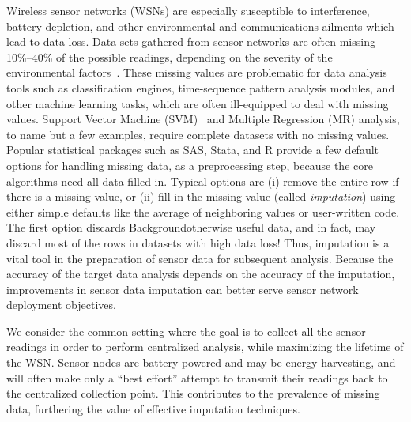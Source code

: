 

Wireless sensor networks (WSNs) are especially susceptible to interference,
battery depletion, and other environmental and communications ailments
which lead to data loss.  Data sets gathered from sensor networks are
often missing 10\%--40\% of the possible readings, depending on the
severity of the environmental factors~\cite{give cites}.  These
missing values are problematic for data analysis tools such as
classification engines, time-sequence pattern analysis modules, and
other machine learning tasks, which are often ill-equipped to deal
with missing values.  Support Vector Machine
(SVM)~\cite{vapnik2000nature} and Multiple Regression (MR) analysis,
to name but a few examples, require complete datasets with no missing
values.  Popular statistical packages such as SAS, Stata, and R
provide a few default options for handling missing data, as a
preprocessing step, because the core algorithms need all data filled
in.  Typical options are (i) remove the entire row if there is a
missing value, or (ii) fill in the missing value (called {\em
imputation}) using either simple defaults like the average of
neighboring values or user-written code.  The first option discards
Backgroundotherwise useful data, and in fact, may discard most of the rows in
datasets with high data loss!  Thus, imputation is a vital tool in the
preparation of sensor data for subsequent analysis. Because the
accuracy of the target data analysis depends on the accuracy of the
imputation, improvements in sensor data imputation can better serve
sensor network deployment objectives.

We consider the common setting where the goal is to collect all the sensor readings
in order to perform centralized analysis, while maximizing the lifetime of the WSN.
Sensor nodes are battery powered and may be energy-harvesting, and will often make
only a ``best effort'' attempt to transmit their readings back to the centralized 
collection point.  This contributes to the prevalence of missing data, furthering
the value of effective imputation techniques.

